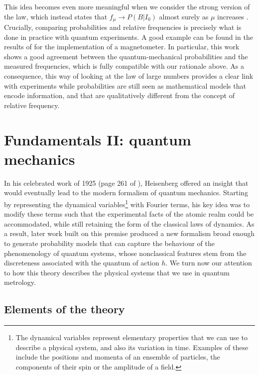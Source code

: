 This idea becomes even more meaningful when we consider the strong version of the law, which instead states that $f_\mu \rightarrow P(B|I_0)$ almost surely as $\mu$ increases \cite{rosenthal2006}. Crucially, comparing probabilities and relative frequencies is precisely what is done in practice with quantum experiments. A good example can be found in the results of \cite{baumgart2016} for the implementation of a magnetometer. In particular, this work shows a good agreement between the quantum-mechanical probabilities and the measured frequencies, which is fully compatible with our rationale above. As a consequence, this way of looking at the law of large numbers provides a clear link with experiments while probabilities are still seen as mathematical models that encode information, and that are qualitatively different from the concept of relative frequency. 

\section{Fundamentals II: quantum mechanics}
\label{sec:qmech}

In his celebrated work of 1925 (page 261 of \cite{waerden1967}), Heisenberg offered an insight that would eventually lead to the modern formalism of quantum mechanics. Starting by representing the dynamical variables\footnote{The dynamical variables represent elementary properties that we can use to describe a physical system, and also its variation in time. Examples of these include the positions and momenta of an ensemble of particles, the components of their spin or the amplitude of a field.} with Fourier terms, his key idea was to modify these terms such that the experimental facts of the atomic realm could be accommodated, while still retaining the form of the classical laws of dynamics. As a result, later work built on this premise produced a new formalism broad enough to generate probability models that can capture the behaviour of the phenomenology of quantum systems, whose nonclassical features stem from the discreteness associated with the quantum of action $h$. We turn now our attention to how this theory describes the physical systems that we use in quantum metrology.  

\subsection{Elements of the theory}
\label{subsec:elements}

